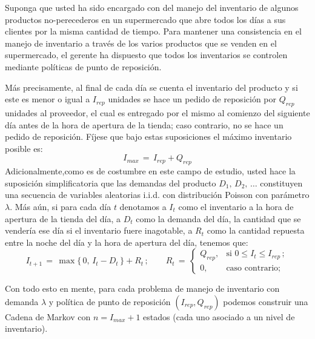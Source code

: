 \documentclass[ a4paper, twoside, 11pt]{article}
\begin{document}
\begin{problem}
Suponga que usted ha sido encargado con del manejo del inventario de algunos productos no-perecederos en un supermercado que abre todos los d\'ias a sus clientes por la misma cantidad de tiempo. Para mantener una consistencia en el manejo de inventario a trav\'es de los varios productos que se venden en el supermercado, el gerente ha dispuesto que todos los inventarios se controlen mediante pol\'iticas de punto de reposici\'on. 

M\'as precisamente, al final de cada d\'ia se cuenta el inventario del producto y si este es menor o igual a $I_{rep}$ unidades se hace un pedido de reposici\'on por $Q_{rep}$ unidades al proveedor, el cual es entregado por el mismo al comienzo del siguiente d\'ia antes de la hora de apertura de la tienda; caso contrario, no se hace un pedido de reposici\'on. F\'ijese que bajo estas suposiciones el m\'aximo inventario posible es:
\[
I_{max} \, = \, I_{rep} + Q_{rep}
\]
Adicionalmente,como es de costumbre en este campo de estudio, usted hace la suposici\'on simplificatoria que las demandas del producto $D_1, \, D_2, \, \dots$ constituyen una secuencia de variables aleatorias i.i.d. con distribuci\'on Poisson con par\'ametro $\lambda$. M\'as a\'un, si para cada d\'ia $t$ denotamos a $I_t$ como el inventario a la hora de apertura de la tienda del \tavo d\'ia, a $D_t$ como la demanda del d\'ia, \ie la cantidad que se vender\'ia ese d\'ia si el inventario fuere inagotable, a $R_t$ como la cantidad repuesta entre la noche del \tavo d\'ia y la hora de apertura del \tMavo d\'ia, tenemos que:
\[
I_{t+1} \, = \, \max \{ \, 0, \, I_t - D_t \, \} + R_t \, ; \qquad
R_t \, = \, 
\begin{cases}
Q_{rep}, & \text{si } 0 \leq I_t \leq I_{rep} \, ; \\
0, & \text{caso contrario;}
\end{cases}
\]

Con todo esto en mente, para cada problema de manejo de inventario con demanda $\lambda$ y pol\'itica de punto de reposici\'on $(I_{rep},Q_{rep})$ podemos construir una Cadena de Markov con \linebreak $n = I_{max} + 1$ estados (cada uno asociado a un nivel de inventario). 


\end{problem}
\end{document}
